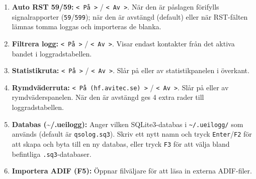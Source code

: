\documentclass[11pt,a4paper]{article}
\begin{document}
\begin{enumerate}
\begin{itemize}
        \item \emph{Field Day (Vintage Radio):} Varm, analog transceiver-atmosfär inspirerad av Gruvbox, mörk antracitbotten, ockragul/bärnsten och läderbrunt.
        \item \emph{Mörkerläge (Crimson Night):} Djupröd och svart mörkeranpassad skärm som bevarar det skotopiska mörkerseendet vid nattliga contester i nedsläckta schack.
        \item \emph{Solarized Dark (Djuphav):} Ethan Schoonovers legendariska, vetenskapligt balanserade mörkblå marinpalett med djup cyan och krämgul text för optimal kontrast och läsbarhet.
        \item \emph{Dracula (Neon Skymning):} Mycket populärt och modernt mörkt tema med skifferviolett bakgrund, neonlila, elcyan och korallrosa accenter.
        \item \emph{Militärradio (Fältgrön):} Taktisk militär känsla i stil med bärbara fältradiostationer, djup olivdrab botten med khaki canvastypografi och mässingsdetaljer.
        \item \emph{Egen profil (Anpassad):} Användarens egna skräddarsydda färgprofil som skapas och redigeras via den inbyggda färgprofilseditorn (\texttt{F7}).
    \end{itemize}
    \item \textbf{Auto RST 59/59:} \texttt{< På >} / \texttt{< Av >}. När den är påslagen förifylls signalrapporter (\texttt{59}/\texttt{599}); när den är avstängd (default) eller när RST-fälten lämnas tomma loggas och importeras de blanka.
    \item \textbf{Filtrera logg:} \texttt{< På >} / \texttt{< Av >}. Visar endast kontakter från det aktiva bandet i loggradstabellen.
    \item \textbf{Statistikruta:} \texttt{< På >} / \texttt{< Av >}. Slår på eller av statistikpanelen i överkant.
    \item \textbf{Rymdväderruta:} \texttt{< På (hf.avitec.se) >} / \texttt{< Av >}. Slår på eller av rymdväderspanelen. När den är avstängd ges 4 extra rader till loggradstabellen.
    \item \textbf{Databas (\textasciitilde/.ueilogg):} Anger vilken SQLite3-databas i \texttt{\textasciitilde/.ueilogg/} som används (default är \texttt{qsolog.sq3}). Skriv ett nytt namn och tryck \texttt{Enter}/\texttt{F2} för att skapa och byta till en ny databas, eller tryck \texttt{F3} för att välja bland befintliga \texttt{.sq3}-databaser.
    \item \textbf{Importera ADIF (F5):} Öppnar filväljare för att läsa in externa ADIF-filer.

\end{enumerate}
\end{document}
